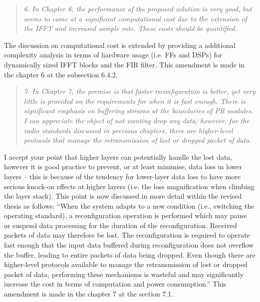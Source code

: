 \documentclass{article}
\begin{document}
\begin{quote}
\emph{6. In Chapter 6, the performance of the proposed solution is very good, but seems to come at a significant computational cost due to the extension of the IFFT and increased sample rate. These costs should be quantified.}
\end{quote}
The discussion on computational cost is extended by providing a additional complexity analysis in terms of hardware usage (i.e. FFs and DSPs) for dynamically sized IFFT blocks and the FIR filter. This amendment is made in the chapter 6 at the subsection 6.4.2.

\begin{quote}
\emph{7. In Chapter 7, the premise is that faster reconfiguration is better, yet very little is provided on the requirements for when it is fast enough. There is significant emphasis on buffering streams at the boundaries of PR modules. I can appreciate the object of not wanting drop any data; however, for the radio standards discussed in previous chapters, there are higher-level protocols that manage the retransmission of lost or dropped packet of data.}
\end{quote}
I accept your point that higher layers can potentially handle the lost data, however it is good practice to prevent, or at least minimise, data loss in lower layers -- this is because of the tendency for lower-layer data loss to have more serious knock-on effects at higher layers (i.e. the  loss magnification when climbing the layer stack). This point is now discussed in more detail within the revised thesis as follows:
``When the system adapts to a new condition (i.e., switching the operating standard), a reconfiguration operation is performed which may pause or suspend data processing for the duration of the reconfiguration. Received packets of data may therefore be lost. 
The reconfiguration is required to operate fast enough that the input data buffered during reconfiguration does not overflow the buffer, leading to entire packets of data being dropped. Even though there are higher-level protocols available to manage the retransmission of lost or dropped packet of data, performing these mechanisms is wasteful and may significantly increase the cost in terms of computation and power consumption.''
This amendment is made in the chapter 7 at the section 7.1.
\end{document}
